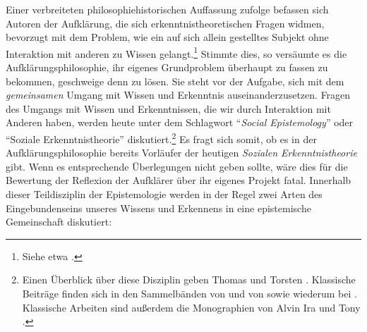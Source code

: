 Einer verbreiteten philosophiehistorischen Auffassung zufolge befassen sich
Autoren der Aufklärung, die sich erkenntnistheoretischen Fragen widmen,
bevorzugt mit dem Problem, wie ein auf sich allein gestelltes Subjekt ohne
Interaktion mit anderen zu Wissen gelangt.\footnote{Siehe etwa
\cite[][passim]{Grundmann:DietraditionelleErkenntnistheorieundihreHerausforderer2001}.}
Stimmte dies, so versäumte es die Aufklärungsphilosophie, ihr eigenes
Grundproblem überhaupt zu fassen zu bekommen, geschweige denn zu lösen. Sie
steht vor der Aufgabe, sich mit dem
\emph{gemeinsamen} Umgang mit Wissen und Erkenntnis auseinanderzusetzen. Fragen
des Umgangs mit Wissen und Erkenntnissen, die wir durch Interaktion mit Anderen
haben, werden heute unter dem Schlagwort \enquote{\emph{Social Epistemology}} oder
\enquote{Soziale Erkenntnistheorie} diskutiert.\footnote{Einen Überblick über
diese Disziplin geben Thomas
\textcite[vgl.][529--541]{Grundmann:AnalytischeEinfuehrungindieErkenntnistheorie2008}
und Torsten \textcite[vgl.][]{Wilholt:SozialeErkenntnistheorie2007}. Klassische
Beiträge finden sich in den Sammelbänden von
\textcite[vgl.][]{Schmitt:SocializingEpistemology1994a} und von
\textcite[vgl.][]{Matilal:KnowingfromWords1994} sowie wiederum bei
\textcite[vgl.][]{Schmitt:SpecialIssue:SocialEpistemology1987}. Klassische
Arbeiten sind außerdem die Monographien von Alvin Ira
\textcite[siehe][]{Goldman:KnowledgeinaSocialWorld1999} und Tony
\textcite[][]{Coady:Testimony1992}.} Es fragt sich somit, ob es in der
Aufklärungsphilosophie bereits Vorläufer der heutigen \emph{Sozialen
Erkenntnistheorie} gibt. Wenn es entsprechende Überlegungen nicht geben sollte,
wäre dies für die Bewertung der Reflexion der Aufklärer über ihr eigenes Projekt
fatal. Innerhalb dieser Teildisziplin der Epistemologie werden in der Regel zwei
Arten des Eingebundenseins unseres Wissens und Erkennens in eine epistemische
Gemeinschaft diskutiert:
\label{Abschnitte:ZweiThemenSozialerErkenntnistheorie}
